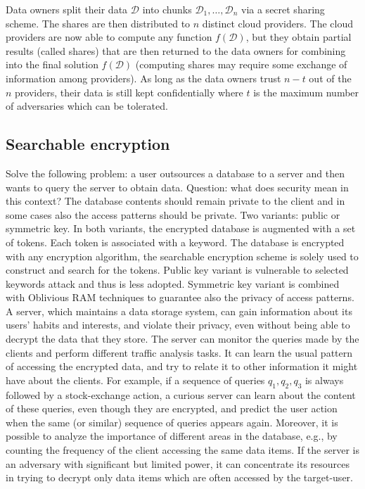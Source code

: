 Data owners split their data $\mathcal{D}$ into chunks $\mathcal{D}_1 ,\ldots, \mathcal{D}_n$ via a secret sharing scheme. The shares are then distributed to $n$ distinct cloud providers. The cloud providers are now able to compute any function $f(\mathcal{D})$, but they obtain partial results (called shares) that are then returned to the data owners for combining into the final solution $f(\mathcal{D})$ (computing shares may require some exchange of information among providers). As long as the data owners trust $n - t$ out of the $n$ providers, their data is still kept confidentially where $t$ is the maximum number of adversaries which can be tolerated.

\subsection{Searchable encryption}
Solve the following problem: a user outsources a database to a server and then wants to query the server to obtain data. Question: what does security mean in this context? The database contents should remain private to the client and in some cases also the access patterns should be private. Two variants: public or symmetric key. In both variants, the encrypted database is augmented with a set of tokens. Each token is associated with a keyword. The database is encrypted with any encryption algorithm, the searchable encryption scheme is solely used to construct and search for the tokens. Public key variant is vulnerable to selected keywords attack and thus is less adopted. Symmetric key variant is combined with Oblivious RAM techniques to guarantee also the privacy of access patterns. 
A server, which maintains a data storage system, can gain information about its users’ habits and interests, and violate their privacy, even without being able to decrypt the data that they store. The server can monitor the queries made by the clients and perform different traffic analysis tasks. It can learn the usual pattern of accessing the encrypted data, and try to relate it to other information it might have about the clients.
For example, if a sequence of queries $q_1, q_2, q_3$ is always followed by a stock-exchange action, a curious server can learn about the content of these queries, even though they are encrypted, and predict the user action when the same (or similar) sequence of queries appears again. Moreover, it is possible to analyze the importance of different areas in the database, e.g., by counting the frequency of the client accessing the same data items. If the server is an adversary with significant but limited power, it can concentrate its resources in trying to decrypt only data items which are often accessed by the target-user.

